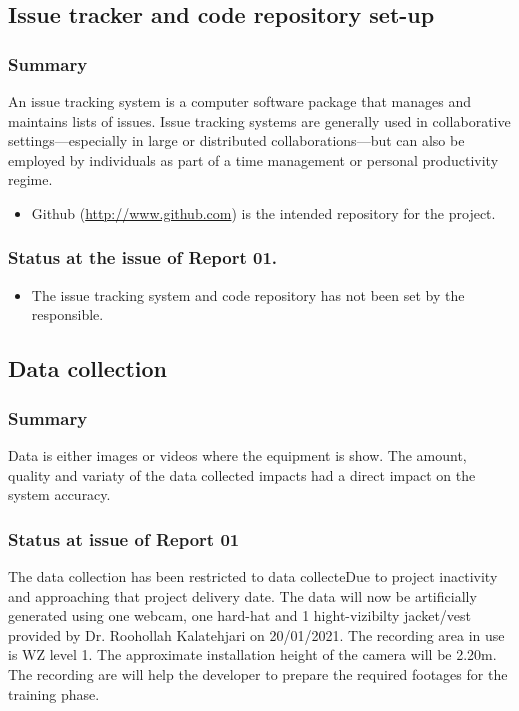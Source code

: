 \documentclass{article}
\begin{document}
\subsection{Issue tracker and code repository set-up}
\label{sec:orgcb0dddf}
\subsubsection{Summary}
\label{sec:org1e45cc7}
An issue tracking system is a computer software package that manages and maintains lists of issues.
Issue tracking systems are generally used in collaborative settings—especially in large or distributed collaborations—but can also be employed by individuals as part of a time management or personal productivity regime.

\begin{itemize}
\item Github (\url{http://www.github.com}) is the intended repository for the project.
\end{itemize}
\subsubsection{Status at the issue of Report 01.}
\label{sec:orgcb1e0a8}
\begin{itemize}
\item The issue tracking system and code repository has not been set by the responsible.
\end{itemize}

\subsection{Data collection}
\label{sec:orgf6e1dd9}

\subsubsection{Summary}
\label{sec:org967a56f}
Data is either images or videos where the equipment is show.
The amount, quality and variaty of the data collected impacts had a direct impact on the system accuracy. 

\subsubsection{Status at issue of Report 01}
\label{sec:org419308a}
The data collection has been restricted to data collecteDue to project inactivity and approaching that project delivery date.
The data will now be artificially generated using one webcam, one hard-hat and 1 hight-vizibilty jacket/vest provided by Dr. Roohollah Kalatehjari on 20/01/2021.
The recording area in use is WZ level 1.
The approximate installation height of the camera will be 2.20m. 
The recording are will help the developer to prepare the required footages for the training phase. 
\end{document}
